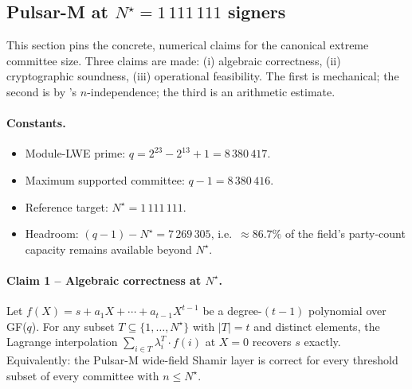
\subsection*{Pulsar-M at $N^\star = 1\,111\,111$ signers}

This section pins the concrete, numerical claims for the canonical
extreme committee size. Three claims are made: (i) algebraic
correctness, (ii) cryptographic soundness, (iii) operational
feasibility. The first is mechanical; the second is by
's $n$-independence; the third is an
arithmetic estimate.

\paragraph{Constants.}
\begin{itemize}[leftmargin=*, itemsep=0pt]
\item Module-LWE prime: $q = 2^{23} - 2^{13} + 1 = 8\,380\,417$.
\item Maximum supported committee: $q - 1 = 8\,380\,416$.
\item Reference target: $N^\star = 1\,111\,111$.
\item Headroom: $(q - 1) - N^\star = 7\,269\,305$, i.e.\
  $\approx 86.7\%$ of the field's party-count capacity remains
  available beyond $N^\star$.
\end{itemize}

\paragraph{Claim 1 -- Algebraic correctness at $N^\star$.}

\begin{proposition}
\label{prop:pulsar-m-correct-at-N-star}
Let $f(X) = s + a_1 X + \cdots + a_{t-1} X^{t-1}$ be a degree-$(t-1)$
polynomial over GF($q$). For any subset $T \subseteq \{1, \dots, N^\star\}$
with $|T| = t$ and distinct elements, the Lagrange interpolation
$\sum_{i \in T} \lambda_i^T \cdot f(i)$ at $X = 0$ recovers $s$
exactly. Equivalently: the Pulsar-M wide-field Shamir layer is
correct for every threshold subset of every committee with $n \le
N^\star$.
\end{proposition}

